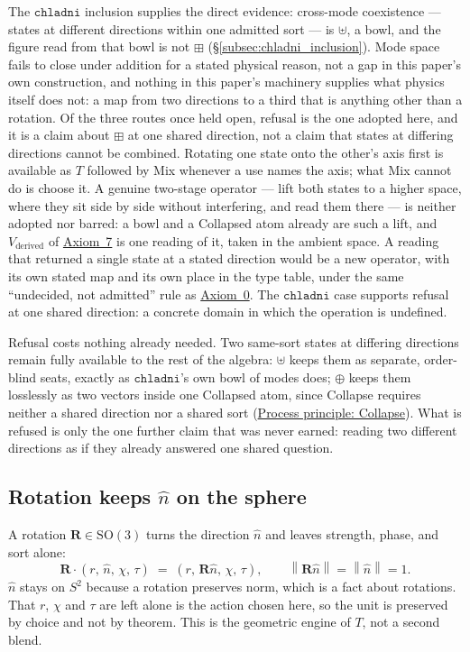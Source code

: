 \documentclass[12pt, a4paper]{article}
\providecommand{\norm}[1]{\left\lVert#1\right\rVert}
\begin{document}
The $\mathtt{chladni}$ inclusion supplies the direct evidence:
cross-mode coexistence --- states at different directions within one
admitted sort --- is $\uplus$, a bowl, and the figure read from that
bowl is not $\boxplus$ (\S\ref{subsec:chladni_inclusion}). Mode space
fails to close under addition for a stated physical reason, not a
gap in this paper's own construction, and nothing in this paper's
machinery supplies what physics itself does not: a map from two
directions to a third that is anything other than a rotation. Of the three routes once held open, refusal is the one adopted here, and it is a claim about $\boxplus$ at one shared direction, not a claim that states at differing directions cannot be combined. Rotating one state onto the other's axis first is available as $T$ followed by Mix whenever a use names the axis; what Mix cannot do is choose it. A genuine two-stage operator --- lift both states to a higher space, where they sit side by side without interfering, and read them there --- is neither adopted nor barred: a bowl and a Collapsed atom already are such a lift, and $V_{\text{derived}}$ of \hyperref[subsec:axiom_v1_metrics]{Axiom~7} is one reading of it, taken in the ambient space. A reading that returned a single state at a stated direction would be a new operator, with its own stated map and its own place in the type table, under the same ``undecided, not admitted'' rule as \hyperref[subsec:axiom0_admissibility]{Axiom~0}. The $\mathtt{chladni}$ case supports refusal at one shared direction: a concrete domain in which the operation is undefined.

Refusal costs nothing already needed. Two same-sort states at
differing directions remain fully available to the rest of the
algebra: $\uplus$ keeps them as separate, order-blind seats, exactly
as $\mathtt{chladni}$'s own bowl of modes does; $\oplus$ keeps them
losslessly as two vectors inside one Collapsed atom, since Collapse requires neither a shared direction nor a shared sort (\hyperref[subsec:process_principle_collapse]{Process principle: Collapse}). What is refused is only the one
further claim that was never earned: reading two different
directions as if they already answered one shared question.

\subsection{Rotation keeps \texorpdfstring{$\hat n$}{n} on the sphere}
\label{subsec:axiom_rotation}
A rotation $\mathbf{R} \in \mathrm{SO}(3)$ turns the direction $\hat n$ and leaves strength, phase, and sort alone:
\begin{equation}
    \mathbf{R}\cdot(r,\,\hat n,\,\chi,\,\tau)
    \;=\;
    (r,\,\mathbf{R}\hat n,\,\chi,\,\tau),
    \qquad
    \norm{\mathbf{R}\hat n} = \norm{\hat n} = 1.
\end{equation}
$\hat n$ stays on $S^2$ because a rotation preserves norm, which is a fact about rotations. That $r$, $\chi$ and $\tau$ are left alone is the action chosen here, so the unit is preserved by choice and not by theorem. This is the geometric engine of $T$, not a second blend.
\end{document}

